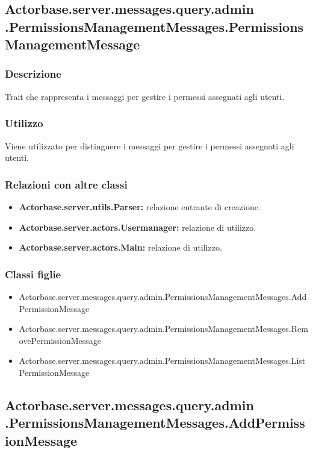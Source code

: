 \documentclass[a4paper]{article}
\begin{document}
		\subsection{Actorbase.server.messages.query.admin \newline
		.PermissionsManagementMessages.PermissionsManagementMessage}
			\subsubsection{Descrizione}
				Trait che rappresenta i messaggi per gestire i permessi assegnati agli utenti.
				
			\subsubsection{Utilizzo}
				Viene utilizzato per distinguere i messaggi per gestire i permessi assegnati agli utenti.
			\subsubsection{Relazioni con altre classi}
				\begin{itemize}
					\item \textbf{Actorbase.server.utils.Parser:} relazione entrante di creazione.
					\item \textbf{Actorbase.server.actors.Usermanager:} relazione di utilizzo.
					\item \textbf{Actorbase.server.actors.Main:} relazione di utilizzo.
				\end{itemize}
			\subsubsection{Classi figlie}
				\begin{itemize}
					\item Actorbase.server.messages.query.admin.PermissionsManagementMessages.AddPermissionMessage
					\item Actorbase.server.messages.query.admin.PermissionsManagementMessages.RemovePermissionMessage
					\item Actorbase.server.messages.query.admin.PermissionsManagementMessages.ListPermissionMessage
				\end{itemize}
			
		\subsection{Actorbase.server.messages.query.admin \newline
		.PermissionsManagementMessages.AddPermissionMessage}
\end{document}

